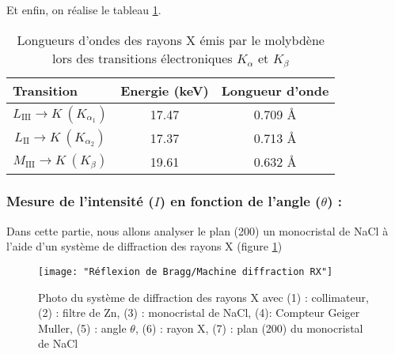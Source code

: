 \newpage
Et enfin, on réalise le tableau \ref{tab: Transition nergitique en les diffrentes couche du molybdne et les diffrentes longueurs donde misse par les transitions}. 
\begin{table}[h!]
	\centering
	\begin{tabular}{|c|c|c|}
		\hline
		\multicolumn{1}{|l|}{\textbf{Transition}} & \multicolumn{1}{l|}{\textbf{Energie (keV)}} & \multicolumn{1}{l|}{\textbf{Longueur d'onde}} \\ \hline
		$L_{\mathrm{III}} \to K \ (K_{\alpha_1}) $                    & 17.47                                       & 0.709 \AA                                       \\ \hline
		$L_{\mathrm{II}} \to K \ (K_{\alpha_2}) $                      & 17.37                                       & 0.713 \AA                                       \\ \hline
		$M_{\mathrm{III}} \to K \ (K_{\beta}) $                         & 19.61                                       & 0.632 \AA                                       \\ \hline
	\end{tabular}
	\caption{\centering Longueurs d'ondes des rayons X émis par le molybdène lors des transitions électroniques $K_{\alpha}$ et $K_{\beta}$}
	\label{tab: Transition nergitique en les diffrentes couche du molybdne et les diffrentes longueurs donde misse par les transitions}
\end{table}





\subsubsection{Mesure de l’intensité ($I$) en fonction de l’angle ($\theta$) :}
Dans cette partie, nous allons analyser le plan (200) un monocristal de NaCl à l'aide d'un système de diffraction des rayons X (figure \ref{fig:machine-diffraction-rx})

\begin{figure}[h!]
	\centering
	\texttt{[image: "Réflexion de Bragg/Machine diffraction RX"]}
	\caption{\centering Photo du système de diffraction des rayons X avec (1) : collimateur, (2) : filtre de Zn, (3) : monocristal de NaCl, (4): Compteur Geiger Muller, (5) : angle $\theta$, (6) : rayon X, (7) : plan (200) du monocristal de NaCl }
	\label{fig:machine-diffraction-rx}
\end{figure}




